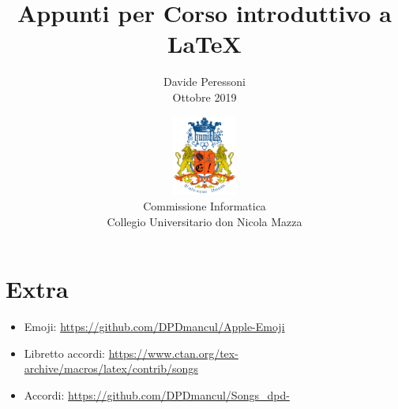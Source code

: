 \documentclass[a4paper,12pt]{article}
\begin{document}
\title{Appunti per Corso introduttivo a \LaTeX}
\author{Davide Peressoni\\Ottobre 2019}
\date{\includegraphics[height=100px]{ComInfo}\\Commissione Informatica\\Collegio Universitario don Nicola Mazza}
\maketitle


\restoregeometry\newpage
\tableofcontents
{} %
\label{contents}    %
\newpage


















\section{Extra}
\begin{itemize}
    \item Emoji: \url{https://github.com/DPDmancul/Apple-Emoji}
    \item Libretto accordi: \url{https://www.ctan.org/tex-archive/macros/latex/contrib/songs}
    \item Accordi: \url{https://github.com/DPDmancul/Songs_dpd-}
\end{itemize}
\end{document}
